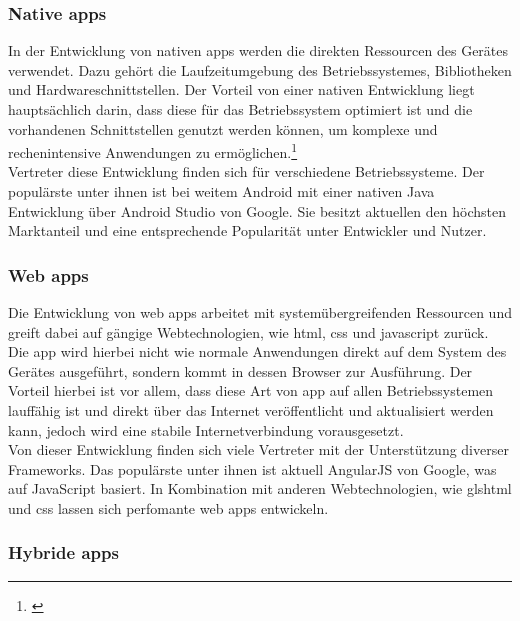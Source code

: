 \subsubsection{Native \glspl{app}}\label{native}

In der Entwicklung von nativen \glspl{app} werden die direkten Ressourcen des Gerätes verwendet. Dazu gehört die Laufzeitumgebung des Betriebssystemes, Bibliotheken und Hardwareschnittstellen. Der Vorteil von einer nativen Entwicklung liegt hauptsächlich darin, dass diese für das Betriebssystem optimiert ist und die vorhandenen Schnittstellen genutzt werden können, um komplexe und rechenintensive Anwendungen zu ermöglichen.\footnote{\citep[vgl.][Unterschiede und Vergleich native Apps vs. Web Apps]{DanielWurstl.Unterschiedeund}\label{note1}}\\
Vertreter diese Entwicklung finden sich für verschiedene Betriebssysteme. Der populärste unter ihnen ist bei weitem Android mit einer nativen Java Entwicklung über Android Studio von Google. Sie besitzt aktuellen den höchsten Marktanteil und eine entsprechende Popularität unter Entwickler und Nutzer.

\subsubsection{Web \glspl{app}}\label{web}

Die Entwicklung von web \glspl{app} arbeitet mit systemübergreifenden Ressourcen und greift dabei auf gängige Webtechnologien, wie \gls{html}, \gls{css} und \gls{javascript} zurück. Die \gls{app} wird hierbei nicht wie normale Anwendungen direkt auf dem System des Gerätes ausgeführt, sondern kommt in dessen Browser zur Ausführung. Der Vorteil hierbei ist vor allem, dass diese Art von \gls{app} auf allen Betriebssystemen lauffähig ist und direkt über das Internet veröffentlicht und aktualisiert werden kann, jedoch wird eine stabile Internetverbindung vorausgesetzt.\\
Von dieser Entwicklung finden sich viele Vertreter mit der Unterstützung diverser Frameworks. Das populärste unter ihnen ist aktuell AngularJS von Google, was auf JavaScript basiert. In Kombination mit anderen Webtechnologien, wie gls{html} und \gls{css} lassen sich perfomante web \glspl{app} entwickeln.

\subsubsection{Hybride \glspl{app}}\label{hybride}

